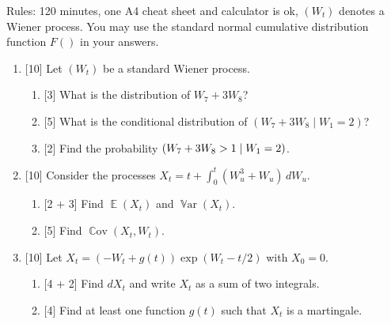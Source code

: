 \documentclass[12pt]{article}
\DeclareMathOperator{\Cov}{\mathbb{C}ov}
\DeclareMathOperator{\Var}{\mathbb{V}ar}
\let\P\relax
\DeclareMathOperator{\P}{\mathbb{P}}
\DeclareMathOperator{\E}{\mathbb{E}}
\begin{document}
Rules: 120 minutes, one A4 cheat sheet and calculator is ok, $(W_t)$ denotes a Wiener process.
You may use the standard normal cumulative distribution function $F()$ in your answers.

\begin{enumerate}
    \item {[10]} Let $(W_t)$ be a standard Wiener process. 
    \begin{enumerate}
        \item {[3]} What is the distribution of $W_7 + 3W_8$? 
        \item {[5]} What is the conditional distribution of $(W_7 + 3W_8 \mid W_1 = 2)$?
        \item {[2]} Find the probability $\P(W_7 + 3W_8 > 1 \mid W_1 = 2)$.
    \end{enumerate}


    \item {[10]} Consider the processes $X_t = t + \int_0^t (W_u^3 + W_u) \, dW_u$.
    \begin{enumerate}
        \item {[2 + 3]} Find $\E(X_t)$ and $\Var(X_t)$.
        \item {[5]} Find $\Cov(X_t, W_t)$.
    \end{enumerate}




    \item {[10]} Let $X_t = (- W_t + g(t))\exp(W_t - t/2)$ with $X_0 = 0$.
    \begin{enumerate}
        \item {[4 + 2]} Find $dX_t$ and write $X_t$ as a sum of two integrals.
        \item {[4]} Find at least one function $g(t)$ such that $X_t$ is a martingale.
    \end{enumerate}


\end{enumerate}
\end{document}
